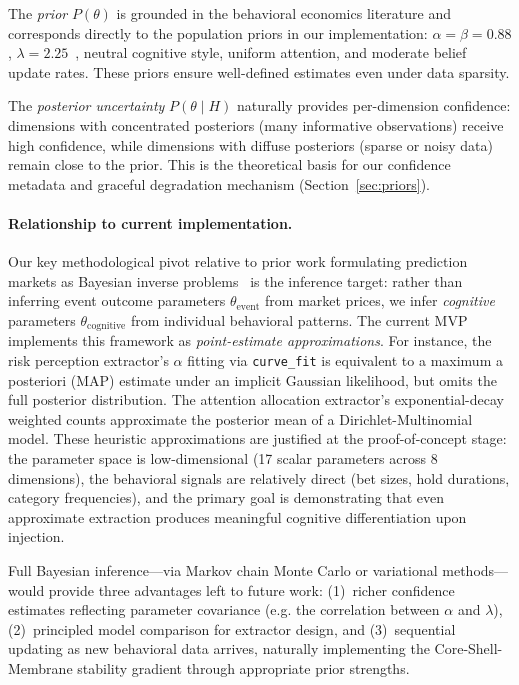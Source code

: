 \documentclass[11pt]{article}
\newcommand{\eg}{e.g.}
\begin{document}
The \emph{prior} $P(\theta)$ is grounded in the behavioral economics literature and corresponds directly to the population priors in our implementation: $\alpha = \beta = 0.88$, $\lambda = 2.25$~\citep{kahneman1979prospect}, neutral cognitive style, uniform attention, and moderate belief update rates. These priors ensure well-defined estimates even under data sparsity.

The \emph{posterior uncertainty} $P(\theta \mid H)$ naturally provides per-dimension confidence: dimensions with concentrated posteriors (many informative observations) receive high confidence, while dimensions with diffuse posteriors (sparse or noisy data) remain close to the prior. This is the theoretical basis for our confidence metadata and graceful degradation mechanism (Section~\ref{sec:priors}).

\paragraph{Relationship to current implementation.}
Our key methodological pivot relative to prior work formulating prediction markets as Bayesian inverse problems~\citep{madrigalcianci2026bayesian} is the inference target: rather than inferring event outcome parameters $\theta_{\text{event}}$ from market prices, we infer \emph{cognitive} parameters $\theta_{\text{cognitive}}$ from individual behavioral patterns. The current MVP implements this framework as \emph{point-estimate approximations}. For instance, the risk perception extractor's $\alpha$ fitting via \texttt{curve\_fit} is equivalent to a maximum a posteriori (MAP) estimate under an implicit Gaussian likelihood, but omits the full posterior distribution. The attention allocation extractor's exponential-decay weighted counts approximate the posterior mean of a Dirichlet-Multinomial model. These heuristic approximations are justified at the proof-of-concept stage: the parameter space is low-dimensional (17 scalar parameters across 8 dimensions), the behavioral signals are relatively direct (bet sizes, hold durations, category frequencies), and the primary goal is demonstrating that even approximate extraction produces meaningful cognitive differentiation upon injection.

Full Bayesian inference---via Markov chain Monte Carlo or variational methods---would provide three advantages left to future work: (1)~richer confidence estimates reflecting parameter covariance (\eg{} the correlation between $\alpha$ and $\lambda$), (2)~principled model comparison for extractor design, and (3)~sequential updating as new behavioral data arrives, naturally implementing the Core-Shell-Membrane stability gradient through appropriate prior strengths.
\end{document}
